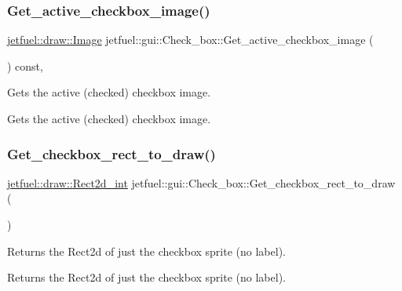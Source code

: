 \subsubsection{\texorpdfstring{Get\+\_\+active\+\_\+checkbox\+\_\+image()}{Get\_active\_checkbox\_image()}}
{\footnotesize\ttfamily \hyperlink{classjetfuel_1_1draw_1_1Image}{jetfuel\+::draw\+::\+Image} jetfuel\+::gui\+::\+Check\+\_\+box\+::\+Get\+\_\+active\+\_\+checkbox\+\_\+image (\begin{DoxyParamCaption}{ }\end{DoxyParamCaption}) const\hspace{0.3cm}{\ttfamily [inline]}, {\ttfamily [protected]}}



Gets the active (checked) checkbox image. 

Gets the active (checked) checkbox image. \mbox{\label{classjetfuel_1_1gui_1_1Check__box_a83b3fc8469caf6c33e41fc1b4fe7295c}} 
\subsubsection{\texorpdfstring{Get\+\_\+checkbox\+\_\+rect\+\_\+to\+\_\+draw()}{Get\_checkbox\_rect\_to\_draw()}}
{\footnotesize\ttfamily \hyperlink{classjetfuel_1_1draw_1_1Rect2d}{jetfuel\+::draw\+::\+Rect2d\+\_\+int} jetfuel\+::gui\+::\+Check\+\_\+box\+::\+Get\+\_\+checkbox\+\_\+rect\+\_\+to\+\_\+draw (\begin{DoxyParamCaption}{ }\end{DoxyParamCaption})\hspace{0.3cm}{\ttfamily [inline]}}



Returns the Rect2d of just the checkbox sprite (no label). 

Returns the Rect2d of just the checkbox sprite (no label). \mbox{\label{classjetfuel_1_1gui_1_1Check__box_ae2f2067e485168d7e8794baa1890e9a6}} 
